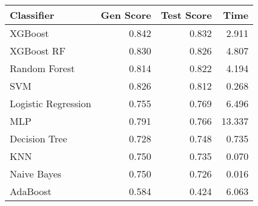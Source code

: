\begin{tabular}{lrrr}
\toprule
Classifier & Gen Score & Test Score & Time \\
\midrule
XGBoost & 0.842 & 0.832 & 2.911 \\
XGBoost RF & 0.830 & 0.826 & 4.807 \\
Random Forest & 0.814 & 0.822 & 4.194 \\
SVM & 0.826 & 0.812 & 0.268 \\
Logistic Regression & 0.755 & 0.769 & 6.496 \\
MLP & 0.791 & 0.766 & 13.337 \\
Decision Tree & 0.728 & 0.748 & 0.735 \\
KNN & 0.750 & 0.735 & 0.070 \\
Naive Bayes & 0.750 & 0.726 & 0.016 \\
AdaBoost & 0.584 & 0.424 & 6.063 \\
\bottomrule
\end{tabular}
